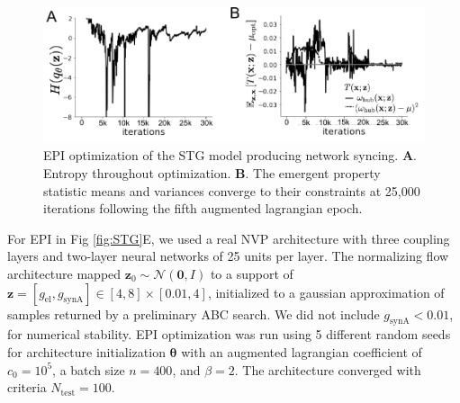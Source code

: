 \documentclass[11pt]{article}
\begin{document}
\begin{figure}
\begin{center}
\includegraphics[scale=0.8]{figures/figSTG1/figSTG1.pdf}
\end{center}
\caption{EPI optimization of the STG model producing network syncing. 
\textbf{A}. Entropy throughout optimization. 
\textbf{B}. The emergent property statistic means and variances converge to their constraints at 25,000 iterations following the fifth augmented lagrangian epoch.}
\label{fig:STG1}
\end{figure}

For EPI in Fig \ref{fig:STG}E, we used a real NVP architecture with three coupling layers and two-layer neural networks of 25 units per layer.
The normalizing flow architecture mapped $\mathbf{z}_0 \sim \mathcal{N}(\mathbf{0}, I)$ to a support of $\mathbf{z} = [g_{\text{el}}, g_{\text{synA}}] \in [4,8] \times [0.01,4]$, initialized to a gaussian approximation of samples returned by a preliminary ABC search.
We did not include $g_{\text{synA}} < 0.01$, for numerical stability.
EPI optimization was run using 5 different random seeds for architecture initialization $\bm{\theta}$ with an augmented lagrangian coefficient of $c_0 = 10^{5}$, a batch size $n=400$, and $\beta = 2$.
The architecture converged with criteria $N_{\text{test}} = 100$.
\end{document}
